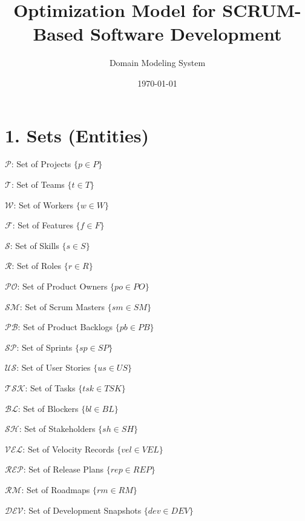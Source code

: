\documentclass[12pt]{article}
\title{Optimization Model for SCRUM-Based Software Development}
\author{Domain Modeling System}
\date{\today}
\begin{document}
\maketitle
\tableofcontents
\newpage

\section{1. Sets (Entities)}
\item $ \mathcal{P} $: Set of Projects $ \{ p \in P \} $
    \item $ \mathcal{T} $: Set of Teams $ \{ t \in T \} $
    \item $ \mathcal{W} $: Set of Workers $ \{ w \in W \} $
    \item $ \mathcal{F} $: Set of Features $ \{ f \in F \} $
    \item $ \mathcal{S} $: Set of Skills $ \{ s \in S \} $
    \item $ \mathcal{R} $: Set of Roles $ \{ r \in R \} $
    \item $ \mathcal{PO} $: Set of Product Owners $ \{ po \in PO \} $
    \item $ \mathcal{SM} $: Set of Scrum Masters $ \{ sm \in SM \} $
    \item $ \mathcal{PB} $: Set of Product Backlogs $ \{ pb \in PB \} $
    \item $ \mathcal{SP} $: Set of Sprints $ \{ sp \in SP \} $
    \item $ \mathcal{US} $: Set of User Stories $ \{ us \in US \} $
    \item $ \mathcal{TSK} $: Set of Tasks $ \{ tsk \in TSK \} $
    \item $ \mathcal{BL} $: Set of Blockers $ \{ bl \in BL \} $
    \item $ \mathcal{SH} $: Set of Stakeholders $ \{ sh \in SH \} $
    \item $ \mathcal{VEL} $: Set of Velocity Records $ \{ vel \in VEL \} $
    \item $ \mathcal{REP} $: Set of Release Plans $ \{ rep \in REP \} $
    \item $ \mathcal{RM} $: Set of Roadmaps $ \{ rm \in RM \} $
    \item $ \mathcal{DEV} $: Set of Development Snapshots $ \{ dev \in DEV \} $
\end{document}
